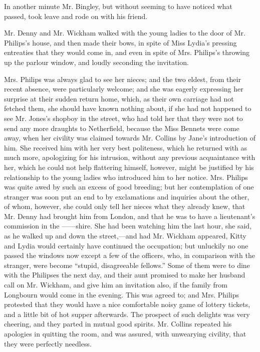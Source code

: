 \documentclass[12pt,openright]{book}
\begin{document}
In another minute Mr. Bingley, but without seeming to have noticed what passed, took leave and rode on with his friend.

Mr. Denny and Mr. Wickham walked with the young ladies to the door of Mr. Philips’s house, and then made their bows, in spite of Miss Lydia’s pressing entreaties that they would come in, and even in spite of Mrs. Philips’s throwing up the parlour window, and loudly seconding the invitation.

Mrs. Philips was always glad to see her nieces; and the two eldest, from their recent absence, were particularly welcome; and she was eagerly expressing her surprise at their sudden return home, which, as their own carriage had not fetched them, she should have known nothing about, if she had not happened to see Mr. Jones’s shopboy in the street, who had told her that they were not to send any more draughts to Netherfield, because the Miss Bennets were come away, when her civility was claimed towards Mr. Collins by Jane’s introduction of him. She received him with her very best politeness, which he returned with as much more, apologizing for his intrusion, without any previous acquaintance with her, which he could not help flattering himself, however, might be justified by his relationship to the young ladies who introduced him to her notice. Mrs. Philips was quite awed by such an excess of good breeding; but her contemplation of one stranger was soon put an end to by exclamations and inquiries about the other, of whom, however, she could only tell her nieces what they already knew, that Mr. Denny had brought him from London, and that he was to have a lieutenant’s commission in the ——shire. She had been watching him the last hour, she said, as he walked up and down the street,—and had Mr. Wickham appeared, Kitty and Lydia would certainly have continued the occupation; but unluckily no one passed the windows now except a few of the officers, who, in comparison with the stranger, were become “stupid, disagreeable fellows.” Some of them were to dine with the Philipses the next day, and their aunt promised to make her husband call on Mr. Wickham, and give him an invitation also, if the family from Longbourn would come in the evening. This was agreed to; and Mrs. Philips protested that they would have a nice comfortable noisy game of lottery tickets, and a little bit of hot supper afterwards. The prospect of such delights was very cheering, and they parted in mutual good spirits. Mr. Collins repeated his apologies in quitting the room, and was assured, with unwearying civility, that they were perfectly needless.
\end{document}
